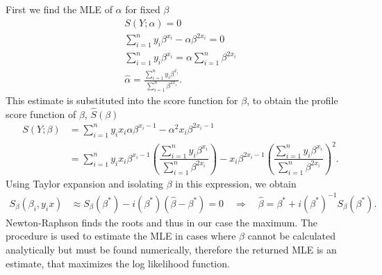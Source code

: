 First we find the MLE of $\alpha$ for fixed $\beta$
\begin{align*}
    S\left( Y; \alpha \right) = 0 \\
    \sum_{i=1}^{n} y_i \beta^{x_i} - \alpha \beta^{2 x_i} = 0 \\
    \sum_{i=1}^{n} y_i \beta^{x_i} = \alpha \sum_{i=1}^{n} \beta^{2 x_i} \\
    \hat{\alpha} = \frac{\sum_{i=1}^{n} y_i \beta^{x_i}}{\sum_{i=1}^{n} \beta^{2x_i}}.
\end{align*}
This estimate is substituted into the score function for $\beta$, to obtain the profile score function of $\beta$, $\hat{S}(\beta)$
\begin{align*}
    S\left( Y; \beta \right) &= \sum_{i=1}^n y_i x_i \alpha \beta^{x_i - 1} - \alpha^2 x_i \beta^{2 x_i - 1}\\
     &= \sum_{i=1}^n y_i x_i \beta^{x_i - 1} \left( \dfrac{\sum_{i=1}^n y_i\beta^{x_i}}{\sum_{i=1}^n \beta^{2x_i}}\right) - x_i\beta^{2x_i-1} \left( \dfrac{\sum_{i=1}^n y_i\beta^{x_i}}{\sum_{i=1}^n \beta^{2x_i}}\right)^2.
\end{align*}
Using Taylor expansion and isolating $\beta$ in this expression, we obtain
\begin{align*}
    S_\beta (\beta_i, y_i x) &\approx S_\beta(\beta^*) - i(\beta^*) (\hat{\beta} - \beta^*) = 0 \quad \Rightarrow \quad
    \hat{\beta} = \beta^* + i(\beta^*)^{-1} S_\beta (\beta^*).
\end{align*}
Newton-Raphson finds the roots and thus in our case the maximum. The procedure is
used to estimate the MLE in cases where $\beta$ cannot be calculated analytically but must be found numerically, therefore the returned MLE is an estimate, that maximizes the log likelihood function.  




